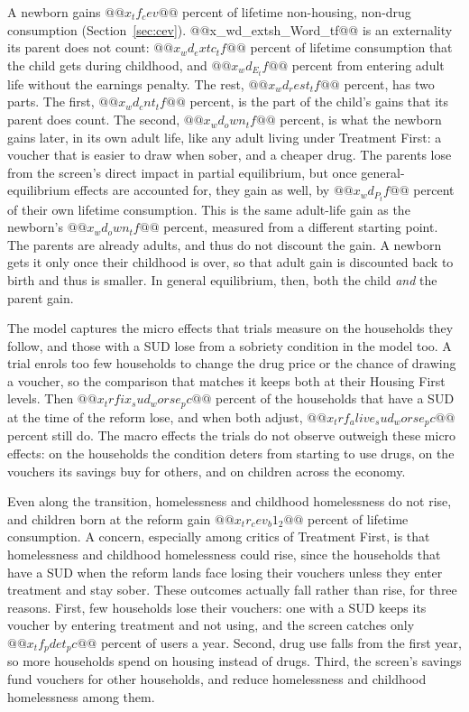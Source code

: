 \documentclass[10pt]{article}
\begin{document}
A newborn gains $@@x_tf_cev@@$ percent of lifetime non-housing, non-drug consumption (Section~\ref{sec:cev}). @@x_wd_extsh_Word_tf@@ is an externality its parent does not count: $@@x_wd_extc_tf@@$ percent of lifetime consumption that the child gets during childhood, and $@@x_wd_E_tf@@$ percent from entering adult life without the earnings penalty. The rest, $@@x_wd_rest_tf@@$ percent, has two parts. The first, $@@x_wd_cnt_tf@@$ percent, is the part of the child's gains that its parent does count. The second, $@@x_wd_own_tf@@$ percent, is what the newborn gains later, in its own adult life, like any adult living under Treatment First: a voucher that is easier to draw when sober, and a cheaper drug. The parents lose from the screen's direct impact in partial equilibrium, but once general-equilibrium effects are accounted for, they gain as well, by $@@x_wd_P_tf@@$ percent of their own lifetime consumption. This is the same adult-life gain as the newborn's $@@x_wd_own_tf@@$ percent, measured from a different starting point.   The parents are already adults, and thus do not discount the gain. A newborn gets it only once their childhood is over, so that adult gain is discounted back to birth and thus is smaller. In general equilibrium, then, both the child \emph{and} the parent gain.

The model captures the micro effects that trials measure on the households they follow, and those with a SUD lose from a sobriety condition in the model too. A trial enrols too few households to change the drug price or the chance of drawing a voucher, so the comparison that matches it keeps both at their Housing First levels. Then $@@x_trfix_sud_worse_pc@@$ percent of the households that have a SUD at the time of the reform lose, and when both adjust, $@@x_trf_alive_sud_worse_pc@@$ percent still do. The macro effects the trials do not observe outweigh these micro effects: on the households the condition deters from starting to use drugs, on the vouchers its savings buy for others, and on children across the economy.

Even along the transition, homelessness and childhood homelessness do not rise, and children born at the reform gain $@@x_tr_cev_b1_2@@$ percent of lifetime consumption. A concern, especially among critics of Treatment First, is that homelessness and childhood homelessness could rise, since the households that have a SUD when the reform lands face losing their vouchers unless they enter treatment and stay sober. These outcomes actually fall rather than rise, for three reasons. First, few households lose their vouchers: one with a SUD keeps its voucher by entering treatment and not using, and the screen catches only $@@x_tf_pdet_pc@@$ percent of users a year. Second, drug use falls from the first year, so more households spend on housing instead of drugs. Third, the screen's savings fund vouchers for other households, and reduce homelessness and childhood homelessness among them.
\end{document}
